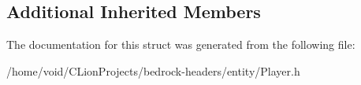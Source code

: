 \subsection*{Additional Inherited Members}


The documentation for this struct was generated from the following file\+:\begin{DoxyCompactItemize}
\item 
/home/void/\+C\+Lion\+Projects/bedrock-\/headers/entity/Player.\+h\end{DoxyCompactItemize}
